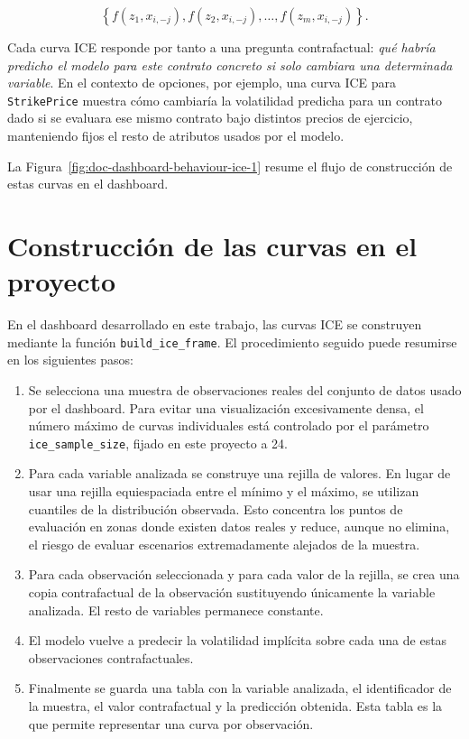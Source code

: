 \begin{equation}
\left\{
f(z_1,x_{i,-j}),
f(z_2,x_{i,-j}),
\ldots,
f(z_m,x_{i,-j})
\right\}.
\end{equation}

Cada curva ICE responde por tanto a una pregunta contrafactual: \emph{qué habría predicho el modelo para este contrato concreto si solo cambiara una determinada variable}. En el contexto de opciones, por ejemplo, una curva ICE para \texttt{StrikePrice} muestra cómo cambiaría la volatilidad predicha para un contrato dado si se evaluara ese mismo contrato bajo distintos precios de ejercicio, manteniendo fijos el resto de atributos usados por el modelo.

La Figura~\ref{fig:doc-dashboard-behaviour-ice-1} resume el flujo de construcción de estas curvas en el dashboard.

\DiagramDashboardBehaviourIceOne

\section*{Construcción de las curvas en el proyecto}

En el dashboard desarrollado en este trabajo, las curvas ICE se construyen mediante la función \texttt{build\_ice\_frame}. El procedimiento seguido puede resumirse en los siguientes pasos:

\begin{enumerate}
    \item Se selecciona una muestra de observaciones reales del conjunto de datos usado por el dashboard. Para evitar una visualización excesivamente densa, el número máximo de curvas individuales está controlado por el parámetro \texttt{ice\_sample\_size}, fijado en este proyecto a 24.

    \item Para cada variable analizada se construye una rejilla de valores. En lugar de usar una rejilla equiespaciada entre el mínimo y el máximo, se utilizan cuantiles de la distribución observada. Esto concentra los puntos de evaluación en zonas donde existen datos reales y reduce, aunque no elimina, el riesgo de evaluar escenarios extremadamente alejados de la muestra.

    \item Para cada observación seleccionada y para cada valor de la rejilla, se crea una copia contrafactual de la observación sustituyendo únicamente la variable analizada. El resto de variables permanece constante.

    \item El modelo vuelve a predecir la volatilidad implícita sobre cada una de estas observaciones contrafactuales.

    \item Finalmente se guarda una tabla con la variable analizada, el identificador de la muestra, el valor contrafactual y la predicción obtenida. Esta tabla es la que permite representar una curva por observación.
\end{enumerate}

